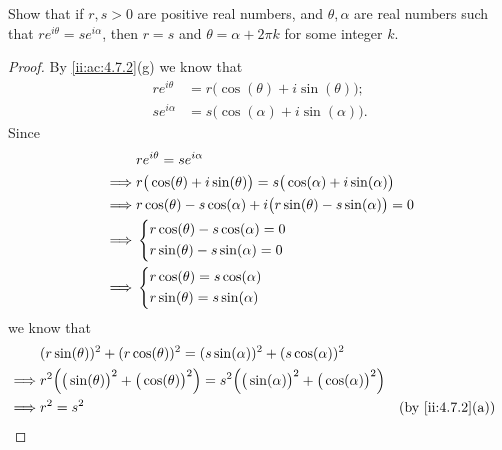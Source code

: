 \begin{ex}\label{ii:ex:4.7.5}
  Show that if \(r, s > 0\) are positive real numbers, and \(\theta, \alpha\) are real numbers such that \(r e^{i \theta} = s e^{i \alpha}\), then \(r = s\) and \(\theta = \alpha + 2 \pi k\) for some integer \(k\).
\end{ex}

\begin{proof}
  By \cref{ii:ac:4.7.2}(g) we know that
  \begin{align*}
    r e^{i \theta} & = r \big(\cos(\theta) + i \sin(\theta)\big); \\
    s e^{i \alpha} & = s \big(\cos(\alpha) + i \sin(\alpha)\big).
  \end{align*}
  Since
  \begin{align*}
             & r e^{i \theta} = s e^{i \alpha}                                                       \\
    \implies & r \big(\cos(\theta) + i \sin(\theta)\big) = s \big(\cos(\alpha) + i \sin(\alpha)\big) \\
    \implies & r \cos(\theta) - s \cos(\alpha) + i \big(r \sin(\theta) - s \sin(\alpha)\big) = 0     \\
    \implies & \begin{dcases}
                 r \cos(\theta) - s \cos(\alpha) = 0 \\
                 r \sin(\theta) - s \sin(\alpha) = 0
               \end{dcases}                                                   \\
    \implies & \begin{dcases}
                 r \cos(\theta) = s \cos(\alpha) \\
                 r \sin(\theta) = s \sin(\alpha)
               \end{dcases}
  \end{align*}
  we know that
  \begin{align*}
             & (r \sin(\theta))^2 + (r \cos(\theta))^2 = (s \sin(\alpha))^2 + (s \cos(\alpha))^2                                                                                          \\
    \implies & r^2 \Big(\big(\sin(\theta)\big)^2 + \big(\cos(\theta)\big)^2\Big) = s^2 \Big(\big(\sin(\alpha)\big)^2 + \big(\cos(\alpha)\big)^2\Big)                                      \\
    \implies & r^2 = s^2                                                                                                                             &                 & \by{ii:4.7.2}[a] \\

\end{align*}
\end{proof}
